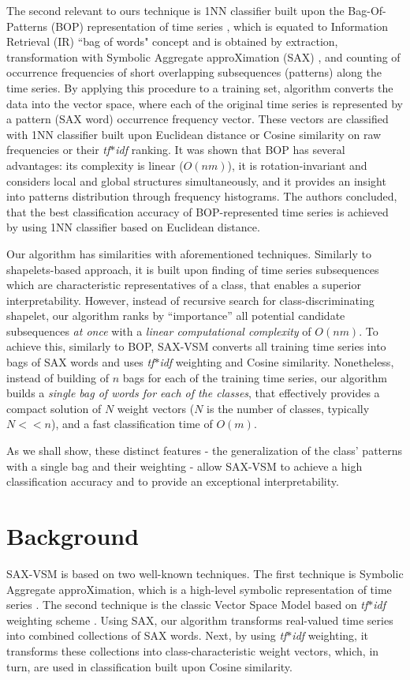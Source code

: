 \documentclass[conference]{IEEEtran}
\begin{document}
The second relevant to ours technique is 1NN classifier built upon the 
Bag-Of-Patterns (BOP) representation of time series \cite{bag_patterns}, 
which is equated to Information Retrieval (IR) ``bag of words" concept 
and is obtained by extraction, transformation with Symbolic Aggregate 
approXimation (SAX) \cite{sax}, and counting of occurrence frequencies
of short overlapping subsequences (patterns) along the time series.
By applying this procedure to a training set, algorithm converts the data into 
the vector space, where each of the original time series is represented by a 
pattern (SAX word) occurrence frequency vector. 
These vectors are classified with 1NN classifier built upon Euclidean distance 
or Cosine similarity on raw frequencies or their \textit{tf$\ast$idf} ranking. 
It was shown that BOP has several advantages: its complexity is linear 
($O(nm)$), it is rotation-invariant and considers local and global structures 
simultaneously, and it provides an insight into patterns distribution through 
frequency histograms.
The authors concluded, that the best classification accuracy of BOP-represented 
time series is achieved by using 1NN classifier based on Euclidean distance.

Our algorithm has similarities with aforementioned techniques. 
Similarly to shapelets-based approach, it is built upon finding of 
time series subsequences which are characteristic representatives 
of a class, that enables a superior interpretability.
However, instead of recursive search for class-discriminating shapelet, 
our algorithm ranks by “importance” all potential candidate subsequences 
\textit{at once} with a \textit{linear computational complexity} of $O(nm)$.
To achieve this, similarly to BOP, \mbox{SAX-VSM} converts all training 
time series into bags of SAX words and uses \textit{tf$\ast$idf} 
weighting and Cosine similarity.
Nonetheless, instead of building of $n$ bags for each of the training time series, 
our algorithm builds a \textit{single bag of words for each of the classes}, 
that effectively provides a compact solution of $N$ weight vectors 
($N$ is the number of classes, typically $N<<n$), and a fast classification time 
of $O(m)$.

As we shall show, these distinct features - the generalization of the class' 
patterns with a single bag and their weighting - allow SAX-VSM to achieve a 
high classification accuracy and to provide an exceptional interpretability.

\section{Background} \label{background}
SAX-VSM is based on two well-known techniques. The first technique is 
Symbolic Aggregate approXimation, which is a high-level symbolic
representation of time series \cite{sax}. 
The second technique is the classic Vector Space Model based on 
\textit{tf$\ast$idf} weighting scheme \cite{salton}. 
Using SAX, our algorithm transforms real-valued time series into combined 
collections of SAX words. Next, by using \textit{tf$\ast$idf} weighting, it 
transforms these collections into class-characteristic weight vectors, 
which, in turn, are used in classification built upon Cosine similarity.
\end{document}
